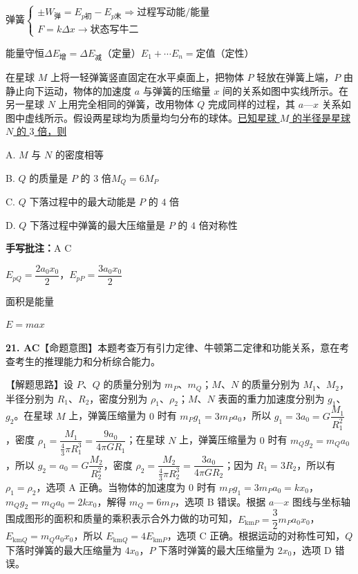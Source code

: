 弹簧\quad $\left\{\begin{array}{l}\pm W_{\text{弹}}=E_{p\text{初}}-E_{p\text{末}}\Rightarrow\text{过程写动能/能量}\\[4pt] F=k\Delta x\to\text{状态写牛二}\end{array}\right.$

能量守恒\quad $\Delta E_{\text{增}}=\Delta E_{\text{减}}$（定量）\quad $E_1+\cdots E_n=$定值（定性）

\begin{problem}[剪贴印刷题]
在星球 $M$ 上将一轻弹簧竖直固定在水平桌面上，把物体 $P$ 轻放在弹簧上端，$P$ 由静止向下运动，物体的加速度 $a$ 与弹簧的压缩量 $x$ 间的关系如图中实线所示。在另一星球 $N$ 上用完全相同的弹簧，改用物体 $Q$ 完成同样的过程，其 $a$—$x$ 关系如图中虚线所示。假设两星球均为质量均匀分布的球体。\underline{已知星球 $M$ 的半径是星球 $N$ 的 $3$ 倍，则}%

A. $M$ 与 $N$ 的密度相等

B. $Q$ 的质量是 $P$ 的 $3$ 倍\quad $M_Q=6M_P$%

C. $Q$ 下落过程中的最大动能是 $P$ 的 $4$ 倍

D. $Q$ 下落过程中弹簧的最大压缩量是 $P$ 的 $4$ 倍\quad 对称性 \unclear{$\checkmark$}%

\textbf{手写批注：}A\,\,C%

$E_{pQ}=\dfrac{2a_0x_0}{2}$，\quad $E_{pP}=\dfrac{3a_0x_0}{2}$%

面积是能量

$E=max$

\begin{solution}
\textbf{21. AC}\quad 【命题意图】本题考查万有引力定律、牛顿第二定律和功能关系，意在考查考生的推理能力和分析综合能力。

【解题思路】设 $P$、$Q$ 的质量分别为 $m_P$、$m_Q$；$M$、$N$ 的质量分别为 $M_1$、$M_2$，半径分别为 $R_1$、$R_2$，密度分别为 $\rho_1$、$\rho_2$；$M$、$N$ 表面的重力加速度分别为 $g_1$、$g_2$。在星球 $M$ 上，弹簧压缩量为 $0$ 时有 $m_Pg_1=3m_Pa_0$，所以 $g_1=3a_0=G\dfrac{M_1}{R_1^2}$，密度 $\rho_1=\dfrac{M_1}{\frac{4}{3}\pi R_1^3}=\dfrac{9a_0}{4\pi GR_1}$；在星球 $N$ 上，弹簧压缩量为 $0$ 时有 $m_Qg_2=m_Qa_0$，所以 $g_2=a_0=G\dfrac{M_2}{R_2^2}$，密度 $\rho_2=\dfrac{M_2}{\frac{4}{3}\pi R_2^3}=\dfrac{3a_0}{4\pi GR_2}$；因为 $R_1=3R_2$，所以有 $\rho_1=\rho_2$，选项 A 正确。当物体的加速度为 $0$ 时有 $m_Pg_1=3m_Pa_0=kx_0$，$m_Qg_2=m_Qa_0=2kx_0$，解得 $m_Q=6m_P$，选项 B 错误。根据 $a$—$x$ 图线与坐标轴围成图形的面积和质量的乘积表示合外力做的功可知，$E_{\mathrm{km}P}=\dfrac{3}{2}m_Pa_0x_0$，$E_{\mathrm{km}Q}=m_Qa_0x_0$，所以 $E_{\mathrm{km}Q}=4E_{\mathrm{km}P}$，选项 C 正确。根据运动的对称性可知，$Q$ 下落时弹簧的最大压缩量为 $4x_0$，$P$ 下落时弹簧的最大压缩量为 $2x_0$，选项 D 错误。
\end{solution}
\end{problem}

